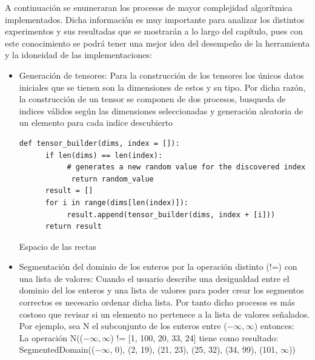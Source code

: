 A continuación se enumeraran los procesos de mayor complejidad algorítmica implementados.
Dicha información es muy importante para analizar los distintos experimentos y sus resultadas
que se mostrarán a lo largo del capítulo, pues con este conocimiento se podrá tener una mejor idea 
del desempeño de la herramienta y la idoneidad de las implementaciones:
\begin{itemize}

      \item Generación de tensores: Para la construcción de los tensores los únicos datos iniciales
            que se tienen son la dimensiones de estos y su tipo. Por dicha razón, la construcción de un tensor
            se componen de dos procesos, busqueda de indices válidos según las dimensiones seleccionadas y 
            generación aleatoria de un elemento para cada indice descubierto
 
            \begin{listing}[!ht]
                  \begin{verbatim}
def tensor_builder(dims, index = []):
      if len(dims) == len(index):
           # generates a new random value for the discovered index 
            return random_value
      result = []
      for i in range(dims[len(index)]):
           result.append(tensor_builder(dims, index + [i]))
      return result
                  \end{verbatim}
                  \caption{Espacio de las rectas}
                  \label{exp:tensors}
              \end{listing}



      \item Segmentación del dominio de los enteros por la operación distinto (!=) con una lista de valores: Cuando el usuario describe
            una desigualdad entre el dominio del los enteros y una lista de valores para poder crear los
            segmentos correctos es necesario ordenar dicha lista. Por tanto dicho procesos es más costoso que
            revisar si un elemento no pertenece a la lista de valores señalados. Por ejemplo, sea N el subconjunto
            de los enteros entre ($-\infty, \infty$) entonces:\\
            La operación N(($-\infty, \infty$) !=  [1, 100, 20, 33, 24] tiene como resultado: \\
            SegmentedDomain(($-\infty$, 0), (2, 19), (21, 23), (25, 32), (34, 99), (101, $\infty$)) 
   


\end{itemize}
